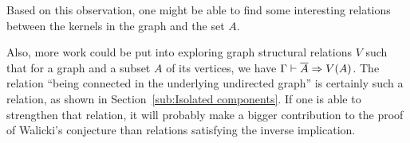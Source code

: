 Based on this observation, one might be able to find some interesting relations between the kernels in the graph and the set $A$.

Also, more work could be put into exploring graph structural relations $V$ such that for a graph and a subset $A$ of its vertices, we have $\Gamma \vdash \ol{A} \Rightarrow V(A)$.
The relation ``being connected in the underlying undirected graph'' is certainly such a relation, as shown in Section~\ref{sub:Isolated components}.
If one is able to strengthen that relation, it will probably make a bigger contribution to the proof of Walicki's conjecture than relations satisfying the inverse implication.
